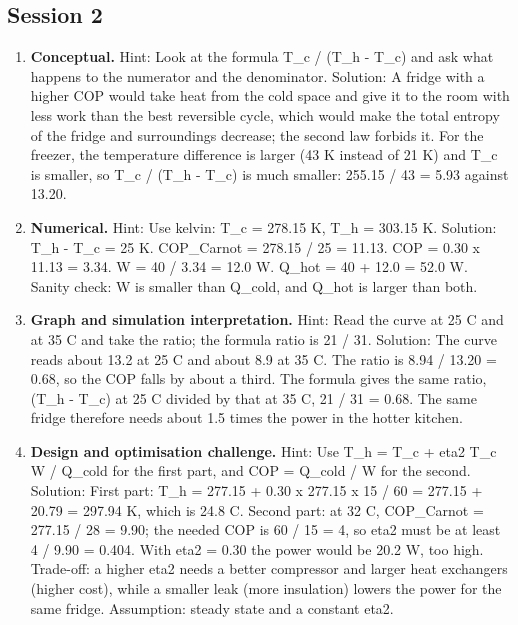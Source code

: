 \documentclass[11pt,a4paper]{article}
\begin{document}
\subsection*{Session 2}
\begin{enumerate}[nosep]
\item \textbf{Conceptual.} Hint: Look at the formula T\_c / (T\_h - T\_c) and ask what happens to the numerator and the denominator. Solution: A fridge with a higher COP would take heat from the cold space and give it to the room with less work than the best reversible cycle, which would make the total entropy of the fridge and surroundings decrease; the second law forbids it. For the freezer, the temperature difference is larger (43 K instead of 21 K) and T\_c is smaller, so T\_c / (T\_h - T\_c) is much smaller: 255.15 / 43 = 5.93 against 13.20.
\item \textbf{Numerical.} Hint: Use kelvin: T\_c = 278.15 K, T\_h = 303.15 K. Solution: T\_h - T\_c = 25 K. COP\_Carnot = 278.15 / 25 = 11.13. COP = 0.30 x 11.13 = 3.34. W = 40 / 3.34 = 12.0 W. Q\_hot = 40 + 12.0 = 52.0 W. Sanity check: W is smaller than Q\_cold, and Q\_hot is larger than both.
\item \textbf{Graph and simulation interpretation.} Hint: Read the curve at 25 C and at 35 C and take the ratio; the formula ratio is 21 / 31. Solution: The curve reads about 13.2 at 25 C and about 8.9 at 35 C. The ratio is 8.94 / 13.20 = 0.68, so the COP falls by about a third. The formula gives the same ratio, (T\_h - T\_c) at 25 C divided by that at 35 C, 21 / 31 = 0.68. The same fridge therefore needs about 1.5 times the power in the hotter kitchen.
\item \textbf{Design and optimisation challenge.} Hint: Use T\_h = T\_c + eta2 T\_c W / Q\_cold for the first part, and COP = Q\_cold / W for the second. Solution: First part: T\_h = 277.15 + 0.30 x 277.15 x 15 / 60 = 277.15 + 20.79 = 297.94 K, which is 24.8 C. Second part: at 32 C, COP\_Carnot = 277.15 / 28 = 9.90; the needed COP is 60 / 15 = 4, so eta2 must be at least 4 / 9.90 = 0.404. With eta2 = 0.30 the power would be 20.2 W, too high. Trade-off: a higher eta2 needs a better compressor and larger heat exchangers (higher cost), while a smaller leak (more insulation) lowers the power for the same fridge. Assumption: steady state and a constant eta2.
\end{enumerate}
\end{document}

